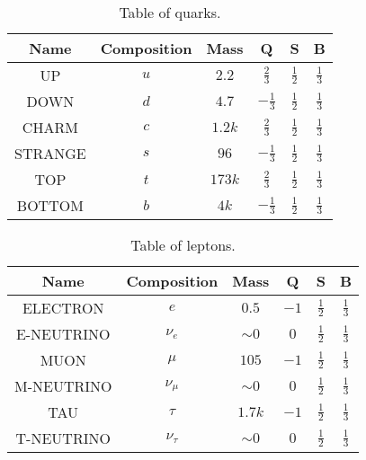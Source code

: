 \documentclass{article}
\begin{document}
\listoftables
\vspace{5pt}

\begin{table}[h!]
    \centering
    \begin{tabular}{||c c c c c c||} 
    \hline
    Name & Composition & Mass & Q & S & B \\ [0.5ex] 
    \hline\hline
    UP & $u$ & $2.2$ & $\frac{2}{3}$ & $\frac{1}{2}$ & $\frac{1}{3}$\\[1ex] 
    DOWN & $d$ & $4.7$ & $-\frac{1}{3}$ & $\frac{1}{2}$ & $\frac{1}{3}$\\[1ex]
    CHARM & $c$ & $1.2k$ & $\frac{2}{3}$ & $\frac{1}{2}$ & $\frac{1}{3}$\\[1ex]
    STRANGE & $s$ & $96$ & $-\frac{1}{3}$ & $\frac{1}{2}$ & $\frac{1}{3}$\\[1ex]
    TOP & $t$ & $173k$ & $\frac{2}{3}$ & $\frac{1}{2}$ & $\frac{1}{3}$\\[1ex]
    BOTTOM & $b$ & $4k$ & $-\frac{1}{3}$ & $\frac{1}{2}$ & $\frac{1}{3}$\\[1ex]
    \hline
    \end{tabular}
    \caption{Table of quarks.}
    \label{table:quarks}
\end{table}

\begin{table}[h!]
    \centering
    \begin{tabular}{||c c c c c c||} 
     \hline
     Name & Composition & Mass & Q & S & B \\ [0.5ex] 
     \hline\hline
     ELECTRON & $e$ & $0.5$ & $-1$ & $\frac{1}{2}$ & $\frac{1}{3}$\\[1ex] 
     E-NEUTRINO & $\nu_e$ & $\sim 0$ & $0$ & $\frac{1}{2}$ & $\frac{1}{3}$\\[1ex]
     MUON & $\mu$ & $105$ & $-1$ & $\frac{1}{2}$ & $\frac{1}{3}$\\[1ex]
     M-NEUTRINO & $\nu_\mu$ & $\sim 0$ & $0$ & $\frac{1}{2}$ & $\frac{1}{3}$\\[1ex]
     TAU & $\tau$ & $1.7k$ & $-1$ & $\frac{1}{2}$ & $\frac{1}{3}$\\[1ex]
     T-NEUTRINO & $\nu_\tau$ & $\sim 0$ & $0$ & $\frac{1}{2}$ & $\frac{1}{3}$\\[1ex]
     \hline
    \end{tabular}
    \caption{Table of leptons.}
    \label{table:leptons}
\end{table}
\end{document}
